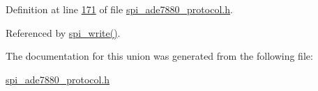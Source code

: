 Definition at line \hyperlink{a00041_source_l00171}{171} of file \hyperlink{a00041_source}{spi\-\_\-ade7880\-\_\-protocol.\-h}.



Referenced by \hyperlink{a00040_source_l00221}{spi\-\_\-write()}.



The documentation for this union was generated from the following file\-:\begin{DoxyCompactItemize}
\item 
\hyperlink{a00041}{spi\-\_\-ade7880\-\_\-protocol.\-h}\end{DoxyCompactItemize}
